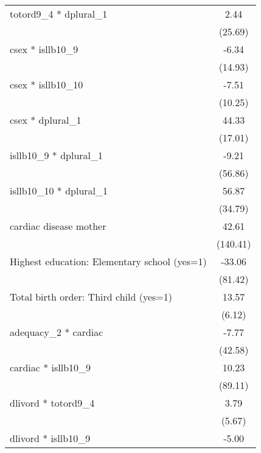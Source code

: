 {\begin{tabular}{l*{1}{c}}
totord9\_4 * dplural\_1                             &        2.44\\
                                                  &     (25.69)\\
csex * isllb10\_9                                  &       -6.34\\
                                                  &     (14.93)\\
csex * isllb10\_10                                 &       -7.51\\
                                                  &     (10.25)\\
csex * dplural\_1                                  &       44.33\\
                                                  &     (17.01)\\
isllb10\_9 * dplural\_1                             &       -9.21\\
                                                  &     (56.86)\\
isllb10\_10 * dplural\_1                            &       56.87\\
                                                  &     (34.79)\\
cardiac disease mother                            &       42.61\\
                                                  &    (140.41)\\
Highest education: Elementary school (yes=1)      &      -33.06\\
                                                  &     (81.42)\\
Total birth order: Third child (yes=1)            &       13.57\\
                                                  &      (6.12)\\
adequacy\_2 * cardiac                              &       -7.77\\
                                                  &     (42.58)\\
cardiac * isllb10\_9                               &       10.23\\
                                                  &     (89.11)\\
dlivord * totord9\_4                               &        3.79\\
                                                  &      (5.67)\\
dlivord * isllb10\_9                               &       -5.00\\

\end{tabular}}
